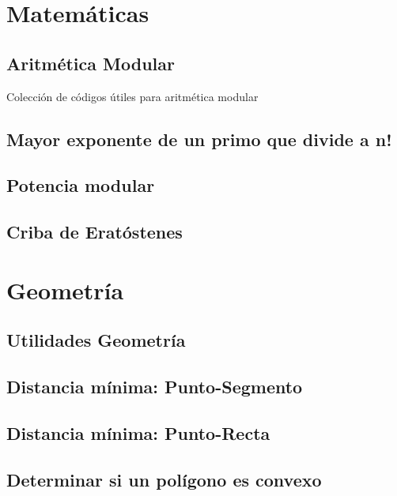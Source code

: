 \documentclass[10pt,letterpaper,twocolumn,twosided]{article}
\newcommand{\codigofuente}[1]{

\dotfill
}
\begin{document}
\section{Matemáticas}

\subsection{Aritmética Modular}

Colección de códigos útiles para aritmética modular\\
\codigofuente{../src/euclidean.${EXT}}

\subsection{Mayor exponente de un primo que divide a n!}
\codigofuente{../src/pow_div.${EXT}}


\subsection{Potencia modular}

\subsection{Criba de Eratóstenes}



\section{Geometría}

\subsection{Utilidades Geometría}

\subsection{Distancia mínima: Punto-Segmento}

\subsection{Distancia mínima: Punto-Recta}

\subsection{Determinar si un polígono es convexo}
\end{document}
